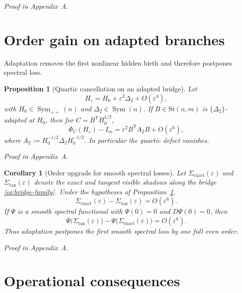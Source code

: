 \documentclass[11pt,a4paper]{article}
\numberwithin{equation}{section}
\DeclareMathOperator{\Sym}{Sym}
\newcommand{\St}{\mathrm{St}}
\theoremstyle{thmcompact}
\newtheorem{proposition}[theorem]{Proposition}
\newtheorem{corollary}[theorem]{Corollary}
\theoremstyle{remark}
\newcommand{\proofappendix}{\par{\hfill\scriptsize\emph{Proof in Appendix~A.}}\par}
\begin{document}
\proofappendix

\section{Order gain on adapted branches}

Adaptation removes the first nonlinear hidden birth and therefore postpones spectral loss.

\begin{proposition}[Quartic cancellation on an adapted bridge]
\label{prop:bridge-consequence}
Let
\begin{equation}
H_{\varepsilon}=H_0+\varepsilon^2\Delta_2+O(\varepsilon^4),
\label{eq:bridge-family}
\end{equation}
with $H_0\in\Sym_{++}(n)$ and $\Delta_2\in\Sym(n)$. If $B\in\St(n,m)$ is $\{\Delta_2\}$-adapted at $H_0$, then for $C=B^{\mathsf T}H_0^{1/2}$,
\begin{equation}
\Phi_C(H_{\varepsilon})-I_m
=
\varepsilon^2B^{\mathsf T}A_2B+O(\varepsilon^6),
\label{eq:quartic-vanishes}
\end{equation}
where $A_2:=H_0^{-1/2}\Delta_2H_0^{-1/2}$. In particular the quartic defect vanishes.
\end{proposition}

\proofappendix

\begin{corollary}[Order upgrade for smooth spectral losses]
\label{cor:octic-upgrade}
Let $\Sigma_{\mathrm{exact}}(\varepsilon)$ and $\Sigma_{\mathrm{tan}}(\varepsilon)$ denote the exact and tangent visible shadows along the bridge \eqref{eq:bridge-family}. Under the hypotheses of Proposition~\ref{prop:bridge-consequence},
\begin{equation}
\Sigma_{\mathrm{exact}}(\varepsilon)-\Sigma_{\mathrm{tan}}(\varepsilon)=O(\varepsilon^6).
\label{eq:matrix-order-upgrade}
\end{equation}
If $\Psi$ is a smooth spectral functional with $\Psi(0)=0$ and $D\Psi(0)=0$, then
\begin{equation}
\Psi\bigl(\Sigma_{\mathrm{tan}}(\varepsilon)\bigr)-\Psi\bigl(\Sigma_{\mathrm{exact}}(\varepsilon)\bigr)=O(\varepsilon^8).
\label{eq:octic-upgrade}
\end{equation}
Thus adaptation postpones the first smooth spectral loss by one full even order.
\end{corollary}

\proofappendix

\section{Operational consequences}
\end{document}
